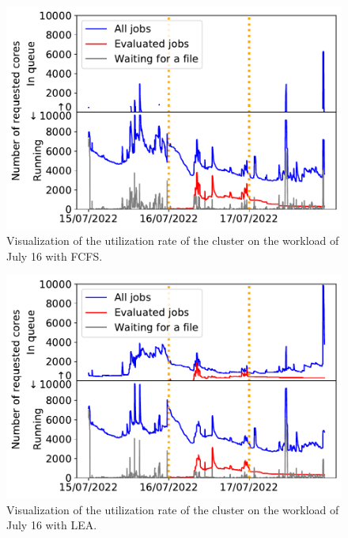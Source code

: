 \documentclass[conference,10pt]{IEEEtran}
\begin{document}
\begin{figure}[t]\centering\includegraphics[width=0.9\linewidth]{../MBSS/plot/Cluster_usage/2022-07-16->2022-07-16_V10000_Fcfs_Used_nodes_Reduced_450_128_32_256_4_1024_core_by_core.pdf}\caption{Visualization of the utilization rate of the cluster on the workload of July 16 with FCFS.}\label{07_16_cluster_usage_fcfs}\end{figure}
\begin{figure}[t]\centering\includegraphics[width=0.9\linewidth]{../MBSS/plot/Cluster_usage/2022-07-16->2022-07-16_V10000_Fcfs_with_a_score_x500_x1_x0_x0_Used_nodes_Reduced_450_128_32_256_4_1024_core_by_core.pdf}\caption{Visualization of the utilization rate of the cluster on the workload of July 16 with LEA.}\label{07_16_cluster_usage_lea}\end{figure}
\end{document}
